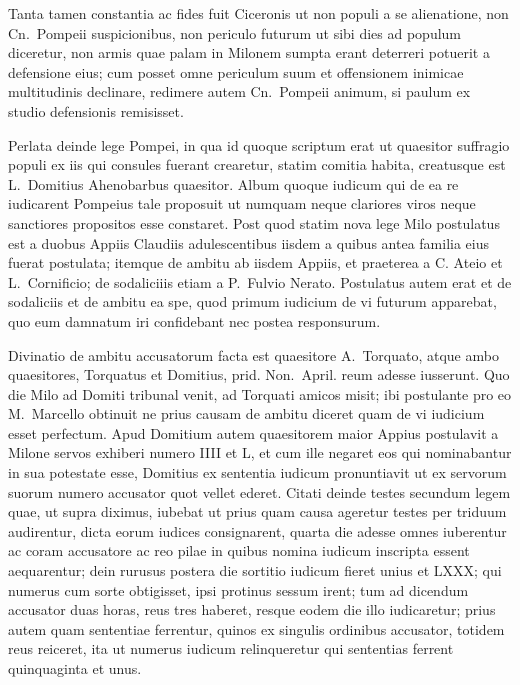 Tanta tamen constantia ac fides fuit Ciceronis ut non populi a se alienatione, non Cn.~Pompeii suspicionibus, non periculo futurum ut sibi dies ad populum diceretur, non armis quae palam in Milonem sumpta erant deterreri potuerit a defensione eius; cum posset omne periculum suum et offensionem inimicae multitudinis declinare, redimere autem Cn.~Pompeii animum, si paulum ex studio defensionis remisisset.

Perlata deinde lege Pompei, in qua id quoque scriptum erat ut quaesitor suffragio populi ex iis qui consules fuerant crearetur, statim comitia habita, creatusque est L.~Domitius Ahenobarbus quaesitor. Album quoque iudicum qui de ea re iudicarent Pompeius tale proposuit ut numquam neque clariores viros neque sanctiores propositos esse constaret. Post quod statim nova lege Milo postulatus est a duobus Appiis Claudiis adulescentibus iisdem a quibus antea familia eius fuerat postulata; itemque de ambitu ab iisdem Appiis, et praeterea a C. Ateio et L.~Cornificio; de sodaliciiis etiam a P.~Fulvio Nerato. Postulatus autem erat et de sodaliciis et de ambitu ea spe, quod primum iudicium de vi futurum apparebat, quo eum damnatum iri confidebant nec postea responsurum.

Divinatio de ambitu accusatorum facta est quaesitore A.~Torquato, atque ambo quaesitores, Torquatus et Domitius, prid. Non.~April. reum adesse iusserunt. Quo die Milo ad Domiti tribunal venit, ad Torquati amicos misit; ibi postulante pro eo M.~Marcello obtinuit ne prius causam de ambitu diceret quam de vi iudicium esset perfectum. Apud Domitium autem quaesitorem maior Appius postulavit a Milone servos exhiberi numero IIII et L, et cum ille negaret eos qui nominabantur in sua potestate esse, Domitius ex sententia iudicum pronuntiavit ut ex servorum suorum numero accusator quot vellet ederet. Citati deinde testes secundum legem quae, ut supra diximus, iubebat ut prius quam causa ageretur testes per triduum audirentur, dicta eorum iudices consignarent, quarta die adesse omnes iuberentur ac coram accusatore ac reo pilae in quibus nomina iudicum inscripta essent aequarentur; dein rurusus postera die sortitio iudicum fieret unius et LXXX; qui numerus cum sorte obtigisset, ipsi protinus sessum irent; tum ad dicendum accusator duas horas, reus tres haberet, resque eodem die illo iudicaretur; prius autem quam sententiae ferrentur, quinos ex singulis ordinibus accusator, totidem reus reiceret, ita ut numerus iudicum relinqueretur qui sententias ferrent quinquaginta et unus.

